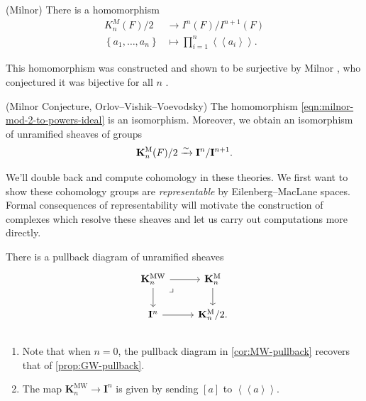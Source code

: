 \documentclass[11pt,openany]{book}
\providecommand{\KM}{\mathbf{K}^\mathrm{M}}
\providecommand{\KMW}{\mathbf{K}^\mathrm{MW}}
\newcommand{\Pfister}[1]{\left\langle\! \left\langle #1 \right\rangle\! \right\rangle}
\begin{document}
\begin{proposition} (Milnor) There is a homomorphism
\begin{equation}\label{eqn:milnor-mod-2-to-powers-ideal}
\begin{aligned}
    K_n^M(F)/2 &\to I^n(F)/I^{n+1}(F) \\
    \left\{ a_1, \ldots, a_n \right\} &\mapsto \prod_{i=1}^n \Pfister{a_i}.
\end{aligned}
\end{equation}
\end{proposition}

This homomorphism was constructed and shown to be surjective by Milnor \cite[4.1]{MilnorK}, who conjectured it was bijective for all $n$ \cite[4.3]{MilnorK}.


\begin{theorem} (Milnor Conjecture, Orlov--Vishik--Voevodsky) The homomorphism \autoref{eqn:milnor-mod-2-to-powers-ideal} is an isomorphism. Moreover, we obtain an isomorphism of unramified sheaves of groups
\begin{align*}
    \KM_n(F)/2 \xto{\sim} \mathbf{I}^n/\mathbf{I}^{n+1}.
\end{align*}
\end{theorem}

\begin{motivation} We'll double back and compute cohomology in these theories. We first want to show these cohomology groups are \textit{representable} by Eilenberg--MacLane spaces. Formal consequences of representability will motivate the construction of complexes which resolve these sheaves and let us carry out computations more directly.
\end{motivation}

\begin{corollary}\label{cor:MW-pullback} 
There is a pullback diagram of unramified sheaves
\[ \begin{tikzcd}
    \KMW_n\rar\dar\pb & \KM_n\dar\\
    \mathbf{I}^n\rar & \KM_n/2.
\end{tikzcd} \]
\end{corollary}

\begin{remark} $\ $
\begin{enumerate}
    \item Note that when $n=0$, the pullback diagram in \autoref{cor:MW-pullback} recovers that of \autoref{prop:GW-pullback}.
    \item The map $\KMW_n \to \mathbf{I}^n$ is given by sending $[a]$ to $\Pfister{a}$.
\end{enumerate}
\end{remark}
\end{document}
